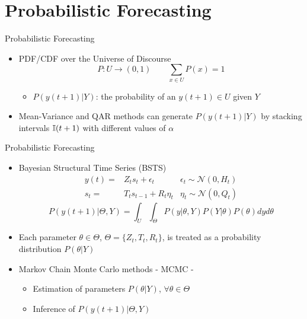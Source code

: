 \documentclass{beamer}
\begin{document}
\section{Probabilistic Forecasting}

\begin{frame}{Probabilistic Forecasting}
\linespread{1.5}
\begin{itemize}
\item PDF/CDF over the Universe of Discourse
$$
P: U \rightarrow (0,1) \qquad \sum_{x \in U} P(x) = 1
$$
\begin{itemize}
    \item $P(y(t+1)|Y)$: the probability of an $y(t+1) \in U$ given $Y$
\end{itemize}
\item Mean-Variance and QAR methods can generate $P(y(t+1)|Y)$ by stacking intervals $\mathbb{I}(t+1)$ with different values of $\alpha$
\end{itemize}
\end{frame}


\begin{frame}{Probabilistic Forecasting}
\begin{itemize}
\item Bayesian Structural Time Series (BSTS) \cite{Scott2014}
$$
\begin{array}{rlc}
    y(t)  = & Z_ts_t + \epsilon_t & \epsilon_t \sim \mathcal{N}(0, H_t) \\
    s_t  = & T_t s_{t-1} + R_t\eta_t & \eta_t \sim \mathcal{N}(0, Q_t)
\end{array}
$$
$$
    P(y(t+1)|\Theta,Y) =  \int_U \int_\Theta P(y|\theta,Y)P(Y|\theta)P(\theta) dy d\theta
$$

\item Each parameter $\theta \in \Theta$, $\Theta= \{Z_t, T_t, R_t\}$, is treated as a probability distribution $P(\theta|Y)$
\item  Markov Chain Monte Carlo methods - MCMC -  \cite{Hastings1970}
\begin{itemize}
    \item Estimation of parameters $P(\theta|Y)$, $\forall \theta \in \Theta$
    \item Inference of $P(y(t+1)|\Theta,Y)$
\end{itemize}
\end{itemize}
\end{frame}
\end{document}
